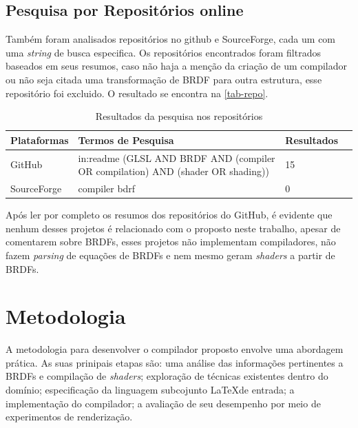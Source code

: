 \documentclass[english, 
               brazil, 
               bsc] %
               {dcomp-abntex2}
\begin{document}
\section{Pesquisa por Repositórios online}
Também foram analisados repositórios no github e SourceForge, cada um com uma \textit{string} de busca especifica. Os repositórios encontrados foram filtrados baseados em seus resumos, caso não haja a menção da criação de um compilador ou não seja citada uma transformação de BRDF para outra estrutura, esse repositório foi excluido. O resultado se encontra na \autoref{tab-repo}.



\begin{table}[H]
\ABNTEXfontereduzida
\caption[bases]{Resultados da pesquisa nos repositórios}
\label{tab-repo}
\begin{tabular}{p{2.6cm}|p{6.0cm}|p{2.25cm}|p{3.40cm}}
   \textbf{Plataformas} & \textbf{Termos de Pesquisa}  & \textbf{Resultados}\\
   \hline
   GitHub
   &
   in:readme (GLSL AND BRDF AND  (compiler OR compilation) AND (shader OR shading))
   & 15
   \\ \hline
   SourceForge
   &
   compiler bdrf
   & 0
\end{tabular}
\end{table}


Após ler por completo os resumos dos repositórios do GitHub, é evidente que nenhum desses projetos é relacionado com o proposto neste trabalho, apesar de comentarem sobre BRDFs, esses projetos não implementam compiladores, não fazem \textit{parsing} de equações de BRDFs e nem mesmo geram \textit{shaders} a partir de BRDFs.

\chapter{Metodologia} \label{metodologia}

A metodologia para desenvolver o compilador proposto envolve uma abordagem prática. As suas prinipais etapas são: uma análise das informações pertinentes a BRDFs e compilação de \textit{shaders}; exploração de técnicas existentes dentro do domínio; especificação da linguagem subcojunto \LaTeX de entrada;  a implementação do compilador; a avaliação de seu desempenho por meio de experimentos de renderização.
\end{document}
